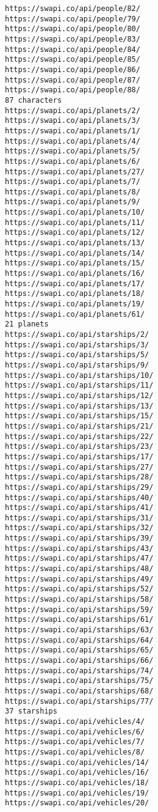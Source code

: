\documentclass[11pt]{article}
\begin{document}
\begin{Verbatim}[commandchars=\\\{\}]
https://swapi.co/api/people/82/
https://swapi.co/api/people/79/
https://swapi.co/api/people/80/
https://swapi.co/api/people/83/
https://swapi.co/api/people/84/
https://swapi.co/api/people/85/
https://swapi.co/api/people/86/
https://swapi.co/api/people/87/
https://swapi.co/api/people/88/
87 characters
https://swapi.co/api/planets/2/
https://swapi.co/api/planets/3/
https://swapi.co/api/planets/1/
https://swapi.co/api/planets/4/
https://swapi.co/api/planets/5/
https://swapi.co/api/planets/6/
https://swapi.co/api/planets/27/
https://swapi.co/api/planets/7/
https://swapi.co/api/planets/8/
https://swapi.co/api/planets/9/
https://swapi.co/api/planets/10/
https://swapi.co/api/planets/11/
https://swapi.co/api/planets/12/
https://swapi.co/api/planets/13/
https://swapi.co/api/planets/14/
https://swapi.co/api/planets/15/
https://swapi.co/api/planets/16/
https://swapi.co/api/planets/17/
https://swapi.co/api/planets/18/
https://swapi.co/api/planets/19/
https://swapi.co/api/planets/61/
21 planets
https://swapi.co/api/starships/2/
https://swapi.co/api/starships/3/
https://swapi.co/api/starships/5/
https://swapi.co/api/starships/9/
https://swapi.co/api/starships/10/
https://swapi.co/api/starships/11/
https://swapi.co/api/starships/12/
https://swapi.co/api/starships/13/
https://swapi.co/api/starships/15/
https://swapi.co/api/starships/21/
https://swapi.co/api/starships/22/
https://swapi.co/api/starships/23/
https://swapi.co/api/starships/17/
https://swapi.co/api/starships/27/
https://swapi.co/api/starships/28/
https://swapi.co/api/starships/29/
https://swapi.co/api/starships/40/
https://swapi.co/api/starships/41/
https://swapi.co/api/starships/31/
https://swapi.co/api/starships/32/
https://swapi.co/api/starships/39/
https://swapi.co/api/starships/43/
https://swapi.co/api/starships/47/
https://swapi.co/api/starships/48/
https://swapi.co/api/starships/49/
https://swapi.co/api/starships/52/
https://swapi.co/api/starships/58/
https://swapi.co/api/starships/59/
https://swapi.co/api/starships/61/
https://swapi.co/api/starships/63/
https://swapi.co/api/starships/64/
https://swapi.co/api/starships/65/
https://swapi.co/api/starships/66/
https://swapi.co/api/starships/74/
https://swapi.co/api/starships/75/
https://swapi.co/api/starships/68/
https://swapi.co/api/starships/77/
37 starships
https://swapi.co/api/vehicles/4/
https://swapi.co/api/vehicles/6/
https://swapi.co/api/vehicles/7/
https://swapi.co/api/vehicles/8/
https://swapi.co/api/vehicles/14/
https://swapi.co/api/vehicles/16/
https://swapi.co/api/vehicles/18/
https://swapi.co/api/vehicles/19/
https://swapi.co/api/vehicles/20/

\end{Verbatim}
\end{document}
